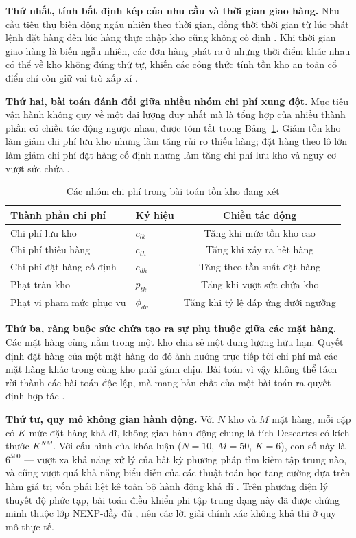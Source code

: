 \textbf{Thứ nhất, tính bất định kép của nhu cầu và thời gian giao hàng.} Nhu
cầu tiêu thụ biến động ngẫu nhiên theo thời gian, đồng thời thời gian từ lúc
phát lệnh đặt hàng đến lúc hàng thực nhập kho cũng không cố định
\parencite{zipkin2000}. Khi thời gian giao hàng là biến ngẫu nhiên, các đơn
hàng phát ra ở những thời điểm khác nhau có thể về kho không đúng thứ tự, khiến
các công thức tính tồn kho an toàn cổ điển chỉ còn giữ vai trò xấp xỉ
\parencite{silver2016}.

\textbf{Thứ hai, bài toán đánh đổi giữa nhiều nhóm chi phí xung đột.} Mục tiêu
vận hành không quy về một đại lượng duy nhất mà là tổng hợp của nhiều thành
phần có chiều tác động ngược nhau, được tóm tắt trong
Bảng~\ref{tab:chiphi}. Giảm tồn kho làm giảm chi phí lưu kho nhưng làm tăng
rủi ro thiếu hàng; đặt hàng theo lô lớn làm giảm chi phí đặt hàng cố định nhưng
làm tăng chi phí lưu kho và nguy cơ vượt sức chứa \parencite{zipkin2000}.

\begin{table}[htbp]
    \centering
    \caption{Các nhóm chi phí trong bài toán tồn kho đang xét}
    \label{tab:chiphi}
    \begin{tabular}{llc}
        \hline
        \textbf{Thành phần chi phí} & \textbf{Ký hiệu} & \textbf{Chiều tác động} \\
        \hline
        Chi phí lưu kho          & $c_{lk}$    & Tăng khi mức tồn kho cao \\
        Chi phí thiếu hàng       & $c_{th}$    & Tăng khi xảy ra hết hàng \\
        Chi phí đặt hàng cố định & $c_{dh}$    & Tăng theo tần suất đặt hàng \\
        Phạt tràn kho            & $p_{tk}$    & Tăng khi vượt sức chứa kho \\
        Phạt vi phạm mức phục vụ & $\phi_{dv}$ & Tăng khi tỷ lệ đáp ứng dưới ngưỡng \\
        \hline
    \end{tabular}
\end{table}

\textbf{Thứ ba, ràng buộc sức chứa tạo ra sự phụ thuộc giữa các mặt hàng.} Các
mặt hàng cùng nằm trong một kho chia sẻ một dung lượng hữu hạn. Quyết định đặt
hàng của một mặt hàng do đó ảnh hưởng trực tiếp tới chi phí mà các mặt hàng
khác trong cùng kho phải gánh chịu. Bài toán vì vậy không thể tách rời thành
các bài toán độc lập, mà mang bản chất của một bài toán ra quyết định hợp tác
\parencite{oliehoek2016}.

\textbf{Thứ tư, quy mô không gian hành động.} Với $N$ kho và $M$ mặt hàng, mỗi
cặp có $K$ mức đặt hàng khả dĩ, không gian hành động chung là tích Descartes
có kích thước $K^{NM}$. Với cấu hình của khóa luận ($N = 10$, $M = 50$,
$K = 6$), con số này là $6^{500}$ --- vượt xa khả năng xử lý của bất kỳ phương
pháp tìm kiếm tập trung nào, và cũng vượt quá khả năng biểu diễn của các thuật
toán học tăng cường dựa trên hàm giá trị vốn phải liệt kê toàn bộ hành động khả
dĩ \parencite{sutton2018}. Trên phương diện lý thuyết độ phức tạp, bài toán
điều khiển phi tập trung dạng này đã được chứng minh thuộc lớp NEXP-đầy đủ
\parencite{bernstein2002}, nên các lời giải chính xác không khả thi ở quy mô
thực tế.

